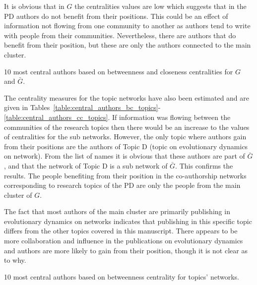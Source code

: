 It is obvious that in \(G\) the centralities values are low which suggests
that in the PD authors do not benefit from their positions. This could be an
effect of information not flowing from one community to another as authors tend
to write with people from their communities. Nevertheless,
there are authors that do benefit from their position, but these are
only the authors connected to the main cluster.

\begin{table}[!hbtp]
    \begin{center}
    \resizebox{.9\textwidth}{!}{}
\end{center}
\caption{10 most central authors based on betweenness and closeness centralities
for \(G\) and \(\bar{G}\).}\label{table:central_authors}
\end{table}

The centrality measures for the topic networks have also been estimated and are
given in
Tables~\ref{table:central_authors_bc_topics}-\ref{table:central_authors_cc_topics}.
If information was flowing between the communities of the research topics then
there would be an increase to the values of centralities for the sub networks.
However, the only topic where authors gain from their positions are the authors
of Topic D (topic on evolutionary dynamics on network). From the list of names it is obvious that these authors are
part of \(\bar{G}\), and that the network of Topic D is a sub network of \(\bar{G}\).
This confirms the results. The people benefiting from their position in the co-authorship networks
corresponding to research topics of the PD are only the people from the main
cluster of \(G\).

The fact that most authors of the main cluster are primarily publishing in
evolutionary dynamics on networks indicates that publishing in this specific
topic differs from the other topics covered in this manuscript. There appears to
be more collaboration and influence in the publications on evolutionary
dynamics and authors are more likely to gain from their position,
though it is not clear as to why.

\begin{table}[!hbtp]
    \begin{center}
    \resizebox{.9\textwidth}{!}{}
\end{center}
\caption{10 most central authors based on betweenness centrality
for topics' networks.}\label{table:central_authors_bc_topics}
\end{table}

